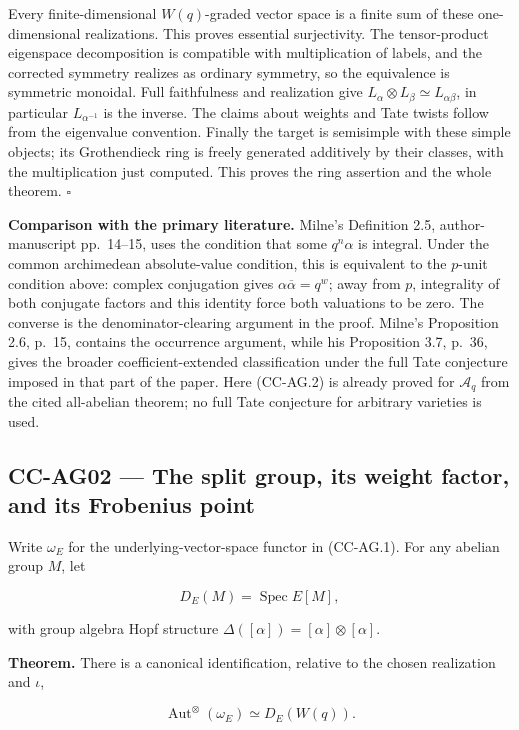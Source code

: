 Every finite-dimensional \(W(q)\)-graded vector space is a finite sum of
these one-dimensional realizations. This proves essential surjectivity.
The tensor-product eigenspace decomposition is compatible with
multiplication of labels, and the corrected symmetry realizes as
ordinary symmetry, so the equivalence is symmetric monoidal. Full
faithfulness and realization give
\(L_\alpha\otimes L_\beta\simeq L_{\alpha\beta}\), in particular
\(L_{\alpha^{-1}}\) is the inverse. The claims about weights and Tate
twists follow from the eigenvalue convention. Finally the target is
semisimple with these simple objects; its Grothendieck ring is freely
generated additively by their classes, with the multiplication just
computed. This proves the ring assertion and the whole theorem.
\(\square\)

\textbf{Comparison with the primary literature.} Milne's Definition 2.5,
author-manuscript pp.~14--15, uses the condition that some \(q^n\alpha\)
is integral. Under the common archimedean absolute-value condition, this
is equivalent to the \(p\)-unit condition above: complex conjugation
gives \(\alpha\overline\alpha=q^w\); away from \(p\), integrality of
both conjugate factors and this identity force both valuations to be
zero. The converse is the denominator-clearing argument in the proof.
Milne's Proposition 2.6, p.~15, contains the occurrence argument, while
his Proposition 3.7, p.~36, gives the broader coefficient-extended
classification under the full Tate conjecture imposed in that part of
the paper. Here (CC-AG.2) is already proved for \(\mathcal A_q\) from
the cited all-abelian theorem; no full Tate conjecture for arbitrary
varieties is used.

\subsection{CC-AG02 --- The split group, its weight factor, and its
Frobenius
point}\label{cc-ag02-the-split-group-its-weight-factor-and-its-frobenius-point}

Write \(\omega_E\) for the underlying-vector-space functor in (CC-AG.1).
For any abelian group \(M\), let

\[
 D_E(M)=\operatorname{Spec}E[M],
\]

with group algebra Hopf structure
\(\Delta([\alpha])=[\alpha]\otimes[\alpha]\).

\textbf{Theorem.} There is a canonical identification, relative to the
chosen realization and \(\iota\),

\[
 \operatorname{Aut}^{\otimes}(\omega_E)
       \simeq D_E(W(q)).                            \tag{CC-AG.3}
\]

